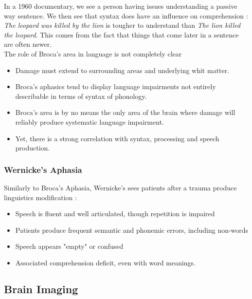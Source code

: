 \documentclass{cours}
\begin{document}
In a 1960 documentary, we see a person having issues understanding a passive way sentence. We then see that syntax does have an influence on comprehension : \textsl{The leopard was killed by the lion} is tougher to understand than \textsl{The lion killed the leopard}. This comes from the fact that things that come later in a sentence are often newer. \\
The role of Broca's area in language is not completely clear
\begin{itemize}
    \item Damage must extend to surrounding areas and underlying whit matter. 
    \item Broca's aphasics tend to display language impairments not entirely describable in terms of syntax of phonology. 
    \item Broca's area is by no means the only area of the brain where damage will reliably produce systematic language impairment. 
    \item Yet, there is a strong correlation with syntax, processing and speech production. 
\end{itemize}

\subsubsection{Wernicke's Aphasia}
Similarly to Broca's Aphasia, Wernicke's sees patients after a trauma produce linguistics modification : 
\begin{itemize}
    \item Speech is fluent and well articulated, though repetition is impaired
    \item Patients produce frequent semantic and phonemic errors, including non-words
    \item Speech appears "empty" or confused
    \item Associated comprehension deficit, even with word meanings. 
\end{itemize}

\subsection{Brain Imaging}
\end{document}
